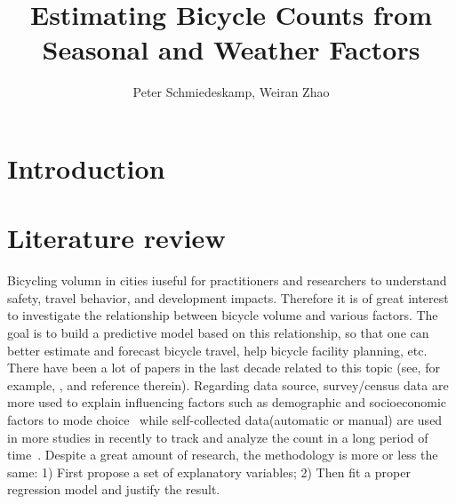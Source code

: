 \documentclass[12pt,letterpaper,article]{memoir} %
\title{Estimating Bicycle Counts from Seasonal and Weather Factors}
\author{Peter Schmiedeskamp, Weiran Zhao}
\begin{document}
\maketitle

\section*{Introduction}
%
% 

\section*{Literature review}
% 
% 

Bicycling volumn in cities iuseful for practitioners and researchers to understand safety, travel behavior, and development impacts. Therefore it is of great interest to investigate the relationship between bicycle volume and various factors. The goal is to build a predictive model based on this relationship, so that one can better estimate and forecast bicycle travel, help bicycle facility planning, etc. There have been a lot of papers in the last decade related to this topic (see, for example, \cite{Griswold11,Nosal12, Fields12, Niemeier96}, and reference therein). Regarding data source, survey/census data are more used to explain influencing factors such as demographic and socioeconomic factors to mode choice~\cite{Parkin08, Helbich14} while self-collected data(automatic or manual) are used in more studies in recently to track and analyze the count in a long period of time~\cite{Griswold11,Nosal12}. Despite a great amount of research, the methodology is more or less the same: 1) First propose a set of explanatory variables; 2) Then fit a proper regression model and justify the result.  
\end{document}
